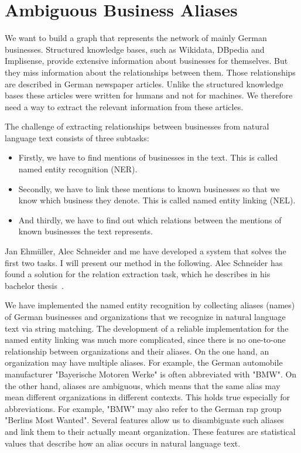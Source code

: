 \section{Ambiguous Business Aliases}
We want to build a graph that represents the network of mainly German businesses. Structured knowledge bases, such as Wikidata, DBpedia and Implisense, provide extensive information about businesses for themselves. But they miss information about the relationships between them. Those relationships are described in German newspaper articles. Unlike the structured knowledge bases these articles were written for humans and not for machines. We therefore need a way to extract the relevant information from these articles.

The challenge of extracting relationships between businesses from natural language text consists of three subtasks:
\begin{itemize}
\item Firstly, we have to find mentions of businesses in the text. This is called named entity recognition (NER).
\item Secondly, we have to link these mentions to known businesses so that we know which business they denote. This is called named entity linking (NEL).
\item And thirdly, we have to find out which relations between the mentions of known businesses the text represents.
\end{itemize}
Jan Ehmüller, Alec Schneider and me have developed a system that solves the first two tasks. I will present our method in the following. Alec Schneider has found a solution for the relation extraction task, which he describes in his bachelor thesis~\cite{Alec}.

We have implemented the named entity recognition by collecting aliases (names) of German businesses and organizations that we recognize in natural language text via string matching. The development of a reliable implementation for the named entity linking was much more complicated, since there is no one-to-one relationship between organizations and their aliases. On the one hand, an organization may have multiple aliases. For example, the German automobile manufacturer "Bayerische Motoren Werke" is often abbreviated with "BMW". On the other hand, aliases are ambiguous, which means that the same alias may mean different organizations in different contexts. This holds true especially for abbreviations. For example, "BMW" may also refer to the German rap group "Berlins Most Wanted".
Several features allow us to disambiguate such aliases and link them to their actually meant organization. These features are statistical values that describe how an alias occurs in natural language text.


